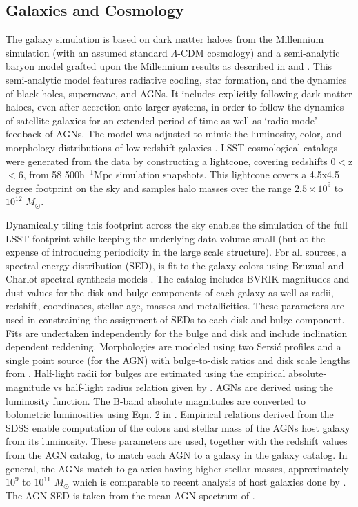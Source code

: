 \documentclass[11pt]{article}
\begin{document}
\subsection{Galaxies and Cosmology \label{sec:gal}}

The galaxy simulation is based on dark matter haloes from the
Millennium simulation \citep{springel05} (with an assumed standard
$\Lambda$-CDM cosmology) and a semi-analytic baryon model grafted upon
the Millennium results as described in \citet{springel05} and
\citet{delucia}. This semi-analytic model features radiative cooling,
star formation, and the dynamics of black holes, supernovae, and
AGNs. It includes explicitly following dark matter haloes, even after
accretion onto larger systems, in order to follow the dynamics of
satellite galaxies for an extended period of time as well as `radio
mode' feedback of AGNs. The model was adjusted to mimic the
luminosity, color, and morphology distributions of low redshift
galaxies \citep{delucia}. LSST cosmological catalogs were generated
from the \citet{delucia} data by constructing a lightcone, covering
redshifts 0$<$z$<$6, from 58 500h$^{-1}$Mpc simulation snapshots. This
lightcone covers a 4.5x4.5 degree footprint on the sky and samples
halo masses over the range $2.5\times10^9$ to $10^{12}$ $M_\odot$.

Dynamically tiling this footprint across the sky enables the
simulation of the full LSST footprint while keeping the underlying
data volume small (but at the expense of introducing periodicity in
the large scale structure).  For all sources, a spectral energy
distribution (SED), is fit to the galaxy colors using Bruzual and
Charlot spectral synthesis models \citep{bruzual}. The \citet{delucia}
catalog includes BVRIK magnitudes and dust values for the disk and
bulge components of each galaxy as well as radii, redshift,
coordinates, stellar age, masses and metallicities. These parameters
are used in constraining the assignment of SEDs to each disk and bulge
component.  Fits are undertaken independently for the bulge and disk
and include inclination dependent reddening. Morphologies are modeled
using two Sersi{\'c} profiles and a single point source (for the AGN)
with bulge-to-disk ratios and disk scale lengths from \citet{delucia}.
Half-light radii for bulges are estimated using the empirical
absolute-magnitude vs half-light radius relation given by
\citet{gonzalez09}.  AGNs are derived using the \citet{bongiorno12}
luminosity function. The B-band absolute magnitudes are converted to
bolometric luminosities using Eqn. 2 in \citet{hopkins07}. Empirical
relations derived from the SDSS enable computation of the colors and
stellar mass of the AGNs host galaxy from its luminosity. These
parameters are used, together with the redshift values from the AGN
catalog, to match each AGN to a galaxy in the galaxy catalog. In
general, the AGNs match to galaxies having higher stellar masses,
approximately $10^{9}$ to $10^{11}$ $M_{\odot}$ which is comparable to
recent analysis of host galaxies done by \citet{xue11}. The AGN SED is
taken from the mean AGN spectrum of \citet{vandenberk}.
\end{document}
